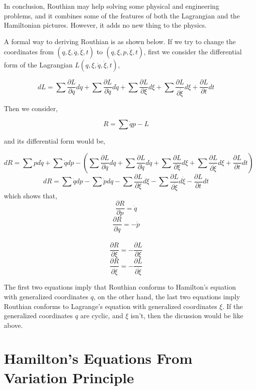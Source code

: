 \documentclass[12pt]{article}
\numberwithin{equation}{section}
\begin{document}
In conclusion, Routhian may help solving some physical and engineering problems, and it combines some of the features of both the Lagrangian and the Hamiltonian pictures. However, it adds no new thing to the physics.

A formal way to deriving Routhian is as shown below.
If we try to change the coordinates from $(q, \xi, \dot{q}, \dot{\xi}, t)$ to $(q, \xi, p, \dot{\xi}, t)$, first we consider the differential form of the Lagrangian $L(q, \xi, \dot{q}, \dot{\xi}, t)$,

\begin{center}
    \[ dL = \sum{\frac{\partial L}{\partial q} dq} + \sum{\frac{\partial L}{\partial \dot{q}} d\dot{q}} + \sum{\frac{\partial L}{\partial \xi} d\xi} + \sum{\frac{\partial L}{\partial \dot{\xi}} d\xi} + \frac{\partial L}{\partial t}dt \]
\end{center}

Then we consider,

\begin{center}
    \[ R = \sum{\dot{q}p} - L \]
\end{center}

and its differential form would be,

\begin{center}
    \[ dR = \sum{pd\dot{q}} + \sum{\dot{q}dp} - \left(\sum{\frac{\partial L}{\partial q} dq} + \sum{\frac{\partial L}{\partial \dot{q}} d\dot{q}} + \sum{\frac{\partial L}{\partial \xi} d\xi} + \sum{\frac{\partial L}{\partial \dot{\xi}} d\xi} + \frac{\partial L}{\partial t}dt \right) \]
    \[ dR = \sum{\dot{q}dp} - \sum{\dot{p}dq} - \sum{\frac{\partial L}{\partial \xi}d\xi} - \sum{\frac{\partial L}{\partial \dot{\xi}}d\dot{\xi}} - \frac{\partial L}{\partial t}dt \]
    which shows that,
    \[ \frac{\partial R}{\partial p} = \dot{q} \]
    \[ \frac{\partial R}{\partial q} = - \dot{p} \]\\
    \[ \frac{\partial R}{\partial \xi} = -\frac{\partial L}{\partial \xi} \]
    \[ \frac{\partial R}{\partial \dot{\xi}} = - \frac{\partial L}{\partial \dot{\xi}} \]
\end{center}

The first two equations imply that Routhian conforms to Hamilton's equation with generalized coordinates $q$, on the other hand, the last two equations imply Routhian conforms to Lagrange's equation with generalized coordinates $\xi$. If the generalized coordinates $q$ are cyclic, and $\xi$ isn't, then the dicussion would be like above.

\section{Hamilton's Equations From Variation Principle}
\end{document}
